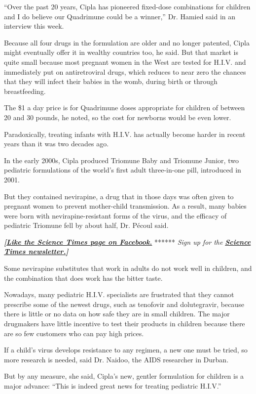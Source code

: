 ``Over the past 20 years, Cipla has pioneered fixed-dose combinations
for children and I do believe our Quadrimune could be a winner,'' Dr.
Hamied said in an interview this week.

Because all four drugs in the formulation are older and no longer
patented, Cipla might eventually offer it in wealthy countries too, he
said. But that market is quite small because most pregnant women in the
West are tested for H.I.V. and immediately put on antiretroviral drugs,
which reduces to near zero the chances that they will infect their
babies in the womb, during birth or through breastfeeding.

The \$1 a day price is for Quadrimune doses appropriate for children of
between 20 and 30 pounds, he noted, so the cost for newborns would be
even lower.

Paradoxically, treating infants with H.I.V. has actually become harder
in recent years than it was two decades ago.

In the early 2000s, Cipla produced Triomune Baby and Triomune Junior,
two pediatric formulations of the world's first adult three-in-one pill,
introduced in 2001.

But they contained nevirapine, a drug that in those days was often given
to pregnant women to prevent mother-child transmission. As a result,
many babies were born with nevirapine-resistant forms of the virus, and
the efficacy of pediatric Triomune fell by about half, Dr. Pécoul said.

\textbf{\emph{{[}}\href{http://on.fb.me/1paTQ1h}{\emph{Like the Science
Times page on Facebook.}}} ****** \emph{\textbar{} Sign up for the}
\textbf{\href{http://nyti.ms/1MbHaRU}{\emph{Science Times
newsletter.}}\emph{{]}}}

Some nevirapine substitutes that work in adults do not work well in
children, and the combination that does work has the bitter taste.

Nowadays, many pediatric H.I.V. specialists are frustrated that they
cannot prescribe some of the newest drugs, such as tenofovir and
dolutegravir, because there is little or no data on how safe they are in
small children. The major drugmakers have little incentive to test their
products in children because there are so few customers who can pay high
prices.

If a child's virus develops resistance to any regimen, a new one must be
tried, so more research is needed, said Dr. Naidoo, the AIDS researcher
in Durban.

But by any measure, she said, Cipla's new, gentler formulation for
children is a major advance: ``This is indeed great news for treating
pediatric H.I.V.''

